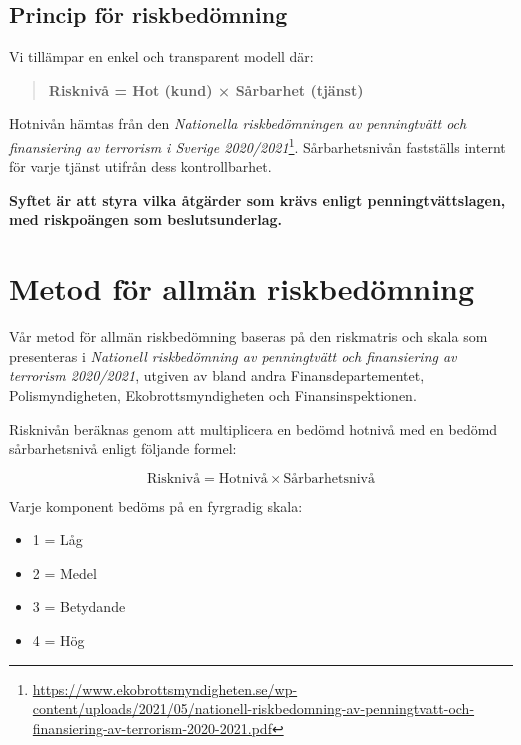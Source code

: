 \documentclass{article}
\begin{document}
\subsection*{Princip för riskbedömning}

Vi tillämpar en enkel och transparent modell där:

\begin{quote}
\textbf{Risknivå = Hot (kund) × Sårbarhet (tjänst)}
\end{quote}

Hotnivån hämtas från den \textit{Nationella riskbedömningen av penningtvätt och finansiering av terrorism i Sverige 2020/2021}\footnote{\url{https://www.ekobrottsmyndigheten.se/wp-content/uploads/2021/05/nationell-riskbedomning-av-penningtvatt-och-finansiering-av-terrorism-2020-2021.pdf}}. Sårbarhetsnivån fastställs internt för varje tjänst utifrån dess kontrollbarhet.

\textbf{Syftet är att styra vilka åtgärder som krävs enligt penningtvättslagen, med riskpoängen som beslutsunderlag.}


\vspace{3em}


\section*{Metod för allmän riskbedömning}

Vår metod för allmän riskbedömning baseras på den riskmatris och skala som presenteras i \textit{Nationell riskbedömning av penningtvätt och finansiering av terrorism 2020/2021}, utgiven av bland andra Finansdepartementet, Polismyndigheten, Ekobrottsmyndigheten och Finansinspektionen.

Risknivån beräknas genom att multiplicera en bedömd hotnivå med en bedömd sårbarhetsnivå enligt följande formel:

\[
\text{Risknivå} = \text{Hotnivå} \times \text{Sårbarhetsnivå}
\]

Varje komponent bedöms på en fyrgradig skala:

\begin{itemize}[label=--]
  \item 1 = Låg
  \item 2 = Medel
  \item 3 = Betydande
  \item 4 = Hög
\end{itemize}
\end{document}
